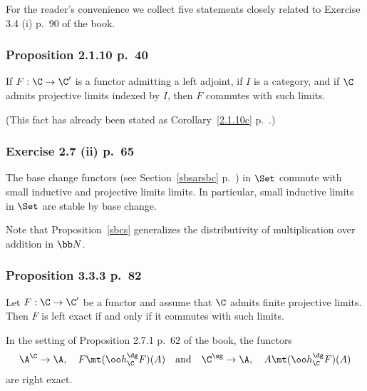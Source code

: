 \documentclass[12pt]{article}
\theoremstyle{remark}
\theoremstyle{definition}
\begin{document}


For the reader's convenience we collect five statements closely related to Exercise 3.4 (i) p.~90 of the book. 

\subsubsection{Proposition 2.1.10 p.~40}

\begin{prop}[Proposition 2.1.10 p.~40]
If $F:\C\to\C'$ is a functor admitting a left adjoint, if $I$ is a category, and if $\C$ admits projective limits indexed by $I$, then $F$ commutes with such limits.
\end{prop}

(This fact has already been stated as Corollary~\ref{2.1.10c} p.~.)

\subsubsection{Exercise 2.7 (ii) p.~65}

\begin{prop}[Exercise 2.7 (ii) p.~65]
The base change functors (see Section~\ref{sbsarsbc} p.~) in $\Set$ commute with small inductive and projective limits limits. In particular, small inductive limits in $\Set$ are stable by base change.
\end{prop}

Note that Proposition~\ref{sbcs} generalizes the distributivity of multiplication over addition in $\bb N$. 

\subsubsection{Proposition 3.3.3 p.~82}

\begin{prop}[Proposition 3.3.3 p.~82]
Let $F:\C\to\C'$ be a functor and assume that $\C$ admits finite projective limits. Then $F$ is left exact if and only if it commutes with such limits.
\end{prop}

\begin{cor}
In the setting of Proposition 2.7.1 p.~62 of the book, the functors
$$
\A^\C\to\A,\quad F\mt(\oo h_\C^\dg F)(A)\quad\text{and}\quad\C^\wg\to\A,\quad A\mt(\oo h_\C^\dg F)(A)
$$ 
are right exact. 
\end{cor}
\end{document}
